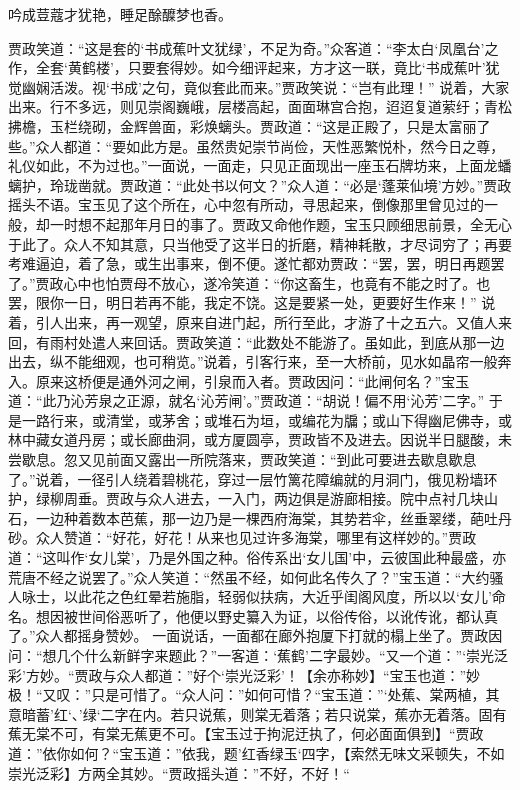 \documentclass[12pt,oneside]{book}
\begin{document}
吟成荳蔻才犹艳，睡足酴醾梦也香。

贾政笑道：“这是套的‘书成蕉叶文犹绿’，不足为奇。”众客道：“李太白‘凤凰台’之作，全套‘黄鹤楼’，只要套得妙。如今细评起来，方才这一联，竟比‘书成蕉叶’犹觉幽娴活泼。视‘书成’之句，竟似套此而来。”贾政笑说：“岂有此理！”
说着，大家出来。行不多远，则见崇阁巍峨，层楼高起，面面琳宫合抱，迢迢复道萦纡；青松拂檐，玉栏绕砌，金辉兽面，彩焕螭头。贾政道：“这是正殿了，只是太富丽了些。”众人都道：“要如此方是。虽然贵妃崇节尚俭，天性恶繁悦朴，然今日之尊，礼仪如此，不为过也。”一面说，一面走，只见正面现出一座玉石牌坊来，上面龙蟠螭护，玲珑凿就。贾政道：“此处书以何文？”众人道：“必是‘蓬莱仙境’方妙。”贾政摇头不语。宝玉见了这个所在，心中忽有所动，寻思起来，倒像那里曾见过的一般，却一时想不起那年月日的事了。贾政又命他作题，宝玉只顾细思前景，全无心于此了。众人不知其意，只当他受了这半日的折磨，精神耗散，才尽词穷了；再要考难逼迫，着了急，或生出事来，倒不便。遂忙都劝贾政：“罢，罢，明日再题罢了。”贾政心中也怕贾母不放心，遂冷笑道：“你这畜生，也竟有不能之时了。也罢，限你一日，明日若再不能，我定不饶。这是要紧一处，更要好生作来！”
说着，引人出来，再一观望，原来自进门起，所行至此，才游了十之五六。又值人来回，有雨村处遣人来回话。贾政笑道：“此数处不能游了。虽如此，到底从那一边出去，纵不能细观，也可稍览。”说着，引客行来，至一大桥前，见水如晶帘一般奔入。原来这桥便是通外河之闸，引泉而入者。贾政因问：“此闸何名？”宝玉道：“此乃沁芳泉之正源，就名‘沁芳闸’。”贾政道：“胡说！偏不用‘沁芳’二字。”
于是一路行来，或清堂，或茅舍；或堆石为垣，或编花为牖；或山下得幽尼佛寺，或林中藏女道丹房；或长廊曲洞，或方厦圆亭，贾政皆不及进去。因说半日腿酸，未尝歇息。忽又见前面又露出一所院落来，贾政笑道：“到此可要进去歇息歇息了。”说着，一径引人绕着碧桃花，穿过一层竹篱花障编就的月洞门，俄见粉墙环护，绿柳周垂。贾政与众人进去，一入门，两边俱是游廊相接。院中点衬几块山石，一边种着数本芭蕉，那一边乃是一棵西府海棠，其势若伞，丝垂翠缕，葩吐丹砂。众人赞道：“好花，好花！从来也见过许多海棠，哪里有这样妙的。”贾政道：“这叫作‘女儿棠’，乃是外国之种。俗传系出‘女儿国’中，云彼国此种最盛，亦荒唐不经之说罢了。”众人笑道：“然虽不经，如何此名传久了？”宝玉道：“大约骚人咏士，以此花之色红晕若施脂，轻弱似扶病，大近乎闺阁风度，所以以‘女儿’命名。想因被世间俗恶听了，他便以野史纂入为证，以俗传俗，以讹传讹，都认真了。”众人都摇身赞妙。
一面说话，一面都在廊外抱厦下打就的榻上坐了。贾政因问：“想几个什么新鲜字来题此？”一客道：‘蕉鹤’二字最妙。“又一个道：”‘崇光泛彩’方妙。“贾政与众人都道：”好个‘崇光泛彩’！【余亦称妙】“宝玉也道：”妙极！“又叹：”只是可惜了。“众人问：”如何可惜？“宝玉道：”‘处蕉、棠两植，其意暗蓄’红‘、’绿‘二字在内。若只说蕉，则棠无着落；若只说棠，蕉亦无着落。固有蕉无棠不可，有棠无蕉更不可。【宝玉过于拘泥迂执了，何必面面俱到】“贾政道：”依你如何？“宝玉道：”依我，题’红香绿玉‘四字，【索然无味文采顿失，不如崇光泛彩】方两全其妙。“贾政摇头道：”不好，不好！“
\end{document}
